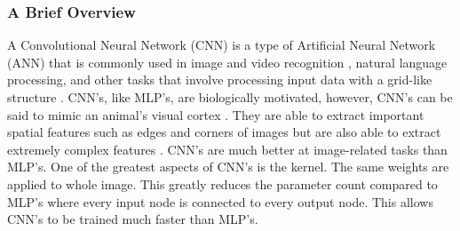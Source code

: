 \subsubsection*{A Brief Overview}
A Convolutional Neural Network (CNN) is a type of Artificial Neural Network (ANN) that is commonly used in image and video recognition , natural language processing, and other tasks that involve processing input data with a grid-like structure \cite{li2021survey}. CNN's, like MLP's, are biologically motivated, however, CNN's can be said to mimic an animal's visual cortex \cite{angermueller2016deep}. They are  able to extract important spatial features such as edges and corners of images but are also able to extract extremely complex features \cite{KATTENBORN202124}. CNN's are much better at image-related tasks than MLP's. One of the greatest aspects of CNN's is the kernel. The same weights are applied to whole image. This greatly reduces the parameter count compared to MLP's where every input node is connected to every output node. This allows CNN's to be trained much faster than MLP's.

